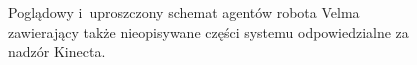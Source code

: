 \begin{figure}
	\centering
	\hfill
	
	\caption{Poglądowy i~uproszczony schemat agentów robota Velma zawierający także nieopisywane części systemu odpowiedzialne za nadzór Kinecta\cite{bib:velma2}.}
	\label{fig:agent}
	
\end{figure}


